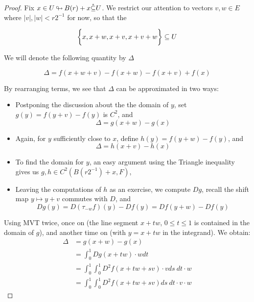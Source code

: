 \documentclass[../main-manifolds.tex]{subfiles}
\begin{document}
\begin{proof}
    Fix $x\in U{\:\looparrowright\:} B(r) + x\mathring{\subseteq} U$. We restrict our attention to vectors $v,w\in E$ where $\vert v\vert, \vert w\vert < r2^{-1}$ for now, so that the

    \[
    \biggl\{{x, x+w, x+v, x+v+w}\biggr\}\subseteq U
    \]

    We will denote the following quantity by $\Delta$

    \[
        \Delta = f(x+w+v) - f(x+w) - f(x+v) + f(x)
    \]

    By rearranging terms, we see that $\Delta$ can be approximated in two ways:

    \begin{itemize}
        \item Postponing the discussion about the the domain of $y$, set $g(y) = f(y+v) - f(y)$ is $C^2$, and 
        \begin{equation}\label{second-derivative-Delta-g}
            \Delta = g(x+w) - g(x)
        \end{equation}
        \item Again, for $y$ sufficiently close to $x$, define $h(y) = f(y+w) - f(y)$, and
        \begin{equation}\label{second-derivative-Delta-h}
            \Delta = h(x+v) - h(x)
        \end{equation}
        \item To find the domain for $y$, an easy argument using the Triangle inequality gives us $g,h \in C^2(B(r2^{-1}) + x, F)$,
        \item Leaving the computations of $h$ as an exercise, we compute $Dg$, recall the shift map $y\mapsto y+v$ commutes with $D$, and
        \begin{equation}\label{second-derivative-Delta-Dg}
            Dg(y) = D(\tau_{-w}f)(y)  - Df(y) = Df(y+w) - Df(y)
        \end{equation}
    \end{itemize}

    Using MVT twice, once on  (the line segment $x + tw$, $0\leq t\leq 1$ is contained in the domain of $g$), and another time on  (with $y = x+tw$ in the integrand). We obtain:
    \begin{align*}
        \Delta &= g(x+w) - g(x)\\
        &= \int_{0}^1 Dg(x+tw)\cdot w dt\\
        &= \int_0^1\int_0^1 D^2f(x + tw+sv)\cdot v ds\: dt \cdot w\\
        &= \int_0^1\int_0^1 D^2f(x + tw + sv) ds\: dt \cdot v\cdot w
    \end{align*}


\end{proof}
\end{document}
